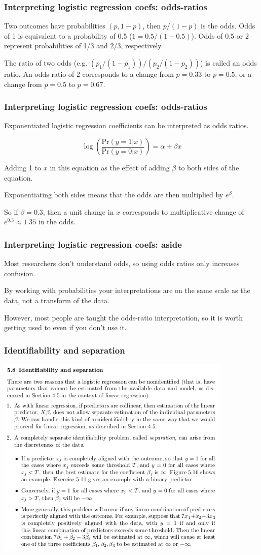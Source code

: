\documentclass{beamer}
\begin{document}
\begin{frame}
  \frametitle{Interpreting logistic regression coefs: odds-ratios}

  Two outcomes have probabilities $(p, 1 - p)$, then $p / (1 - p)$ is the odds. Odds of 1 is equivalent to a probability of 0.5 ($1 = 0.5 / (1 - 0.5)$). Odds of 0.5 or 2 represent probabilities of 1/3 and 2/3, respectively.

  The ratio of two odds (e.g. $(p_{1} / (1 - p_{1})) / (p_{2} / (1 - p_{2}))$) is called an odds ratio. An odds ratio of 2 corresponds to a change from $p = 0.33$ to $p = 0.5$, or a change from $p = 0.5$ to $p = 0.67$.
\end{frame}

\begin{frame}
  \frametitle{Interpreting logistic regression coefs: odds-ratios}
  Exponentiated logistic regression coefficients can be interpreted as odds ratios. 

  \[
    \log \left( \frac{\text{Pr}(y = 1 | x)}{\text{Pr}(y = 0 | x)} \right) = \alpha + \beta x
  \]

  Adding 1 to \(x\) in this equation as the effect of adding \(\beta\) to both sides of the equation. 
  
  Exponentiating both sides means that the odds are then multiplied by \(e^{\beta}\). 
  
  So if \(\beta = 0.3\), then a unit change in \(x\) corresponds to multiplicative change of \(e^{0.3} \approx 1.35\) in the odds.
\end{frame}

\begin{frame}
  \frametitle{Interpreting logistic regression coefs: aside}
  Most researchers don't understand odds, so using odds ratios only increases confusion.

  By working with probabilities your interpretations are on the same scale as the data, not a transform of the data. 

  However, most people are taught the odds-ratio interpretation, so it is worth getting used to even if you don't use it.
\end{frame}


\begin{frame}
  \frametitle{Identifiability and separation}
  
  \includegraphics[width=\textwidth,height=0.8\textheight,keepaspectratio=true]{logit_ident}
\end{frame}
\end{document}
